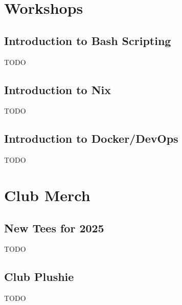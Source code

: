 \documentclass[11pt,fleqn]{article}
\begin{document}
\newpage

\section{Workshops}

\subsection{Introduction to Bash Scripting}

TODO

\subsection{Introduction to Nix}

TODO

\subsection{Introduction to Docker/DevOps}

TODO

\newpage

\section{Club Merch}

\subsection{New Tees for 2025}

TODO

\subsection{Club Plushie}

TODO
\end{document}
